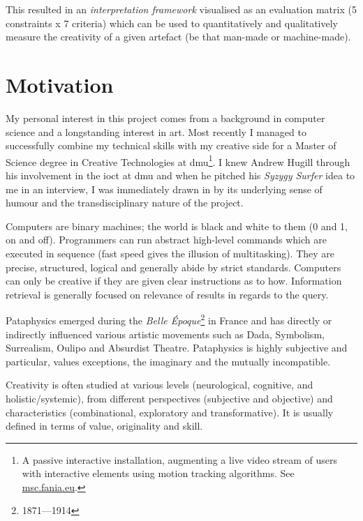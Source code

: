 This resulted in an \emph{interpretation framework} visualised as an evaluation matrix (5 constraints x 7 criteria) which can be used to quantitatively and qualitatively measure the creativity of a given artefact (be that man-made or machine-made).


\section{Motivation}

My personal interest in this project comes from a background in computer science and a longstanding interest in art. Most recently I managed to successfully combine my technical skills with my creative side for a Master of Science degree in Creative Technologies at \gls{dmu}\footnote{A passive interactive installation, augmenting a live video stream of users with interactive elements using motion tracking algorithms. See \url{msc.fania.eu}.}. I knew Andrew Hugill through his involvement in the \gls{ioct} at \gls{dmu} and when he pitched his \emph{Syzygy Surfer} \autocite{Hendler2011, Hendler2013} idea to me in an interview, I was immediately drawn in by its underlying sense of humour and the transdisciplinary nature of the project.

\spirals

Computers are binary machines; the world is black and white to them (0 and 1, on and off). Programmers can run abstract high-level commands which are executed in sequence (fast speed gives the illusion of multitasking). They are precise, structured, logical and generally abide by strict standards. Computers can only be creative if they are given clear instructions as to how. Information retrieval is generally focused on relevance of results in regards to the query.

Pataphysics emerged during the \emph{Belle Époque}\footnote{1871---1914} in France and has directly or indirectly influenced various artistic movements such as Dada, Symbolism, Surrealism, Oulipo and Absurdist Theatre. Pataphysics is highly subjective and particular, values exceptions, the imaginary and the mutually incompatible.

Creativity is often studied at various levels (neurological, cognitive, and holistic/systemic), from different perspectives (subjective and objective) and characteristics (combinational, exploratory and transformative). It is usually defined in terms of value, originality and skill.

